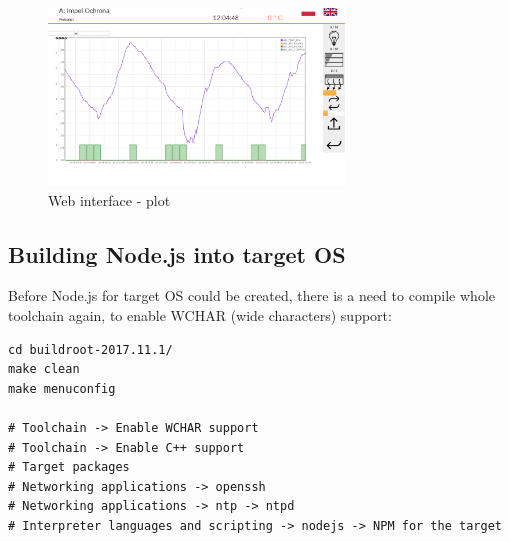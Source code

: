 \documentclass[printmode]{mgr}
\begin{document}
\begin{figure}[htbp]
  \centering
    \includegraphics[width=0.7\textwidth]{6-web.png}
    \caption{Web interface - plot}
  \label{fig:6-web}
\end{figure}


\subsection*{Building Node.js into target OS}

Before Node.js for target OS could be created, there is a need to compile whole toolchain again, to enable WCHAR (wide characters) support:

\begin{lstlisting}
cd buildroot-2017.11.1/
make clean
make menuconfig

# Toolchain -> Enable WCHAR support
# Toolchain -> Enable C++ support
# Target packages
# Networking applications -> openssh
# Networking applications -> ntp -> ntpd
# Interpreter languages and scripting -> nodejs -> NPM for the target
\end{lstlisting}










\end{document}
